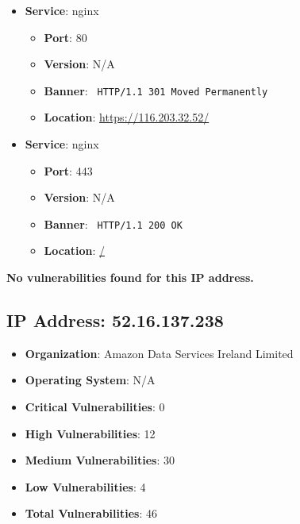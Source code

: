 \documentclass{article}
\begin{document}
\begin{itemize}
    
        \item \textbf{Service}: nginx
        \begin{itemize}
            \item \textbf{Port}: 80
            \item \textbf{Version}:  N/A 
            \item \textbf{Banner}: \texttt{ HTTP/1.1 301 Moved Permanently
 }
            \item \textbf{Location}: \href{ https://116.203.32.52/ }{ https://116.203.32.52/ }
        \end{itemize}
    
        \item \textbf{Service}: nginx
        \begin{itemize}
            \item \textbf{Port}: 443
            \item \textbf{Version}:  N/A 
            \item \textbf{Banner}: \texttt{ HTTP/1.1 200 OK
 }
            \item \textbf{Location}: \href{ / }{ / }
        \end{itemize}
    
\end{itemize}


\textbf{No vulnerabilities found for this IP address.}


\clearpage



\subsection*{IP Address: 52.16.137.238}

\begin{itemize}
    \item \textbf{Organization}: Amazon Data Services Ireland Limited
    \item \textbf{Operating System}:  N/A 
    \item \textbf{Critical Vulnerabilities}: 0
    \item \textbf{High Vulnerabilities}: 12
    \item \textbf{Medium Vulnerabilities}: 30
    \item \textbf{Low Vulnerabilities}: 4
    \item \textbf{Total Vulnerabilities}: 46
\end{itemize}
\end{document}
